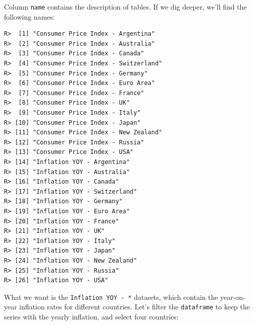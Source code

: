 \documentclass[
  12pt,
]{book}
\newenvironment{Shaded}{\begin{snugshade}}{\end{snugshade}}
\newcommand{\CommentTok}[1]{\textcolor[rgb]{0.37,0.37,0.37}{\textit{#1}}}
\newcommand{\FunctionTok}[1]{\textcolor[rgb]{0,0,0}{#1}}
\newcommand{\NormalTok}[1]{#1}
\newcommand{\OtherTok}[1]{\textcolor[rgb]{0.37,0.37,0.37}{#1}}
\newcommand{\SpecialCharTok}[1]{\textcolor[rgb]{0,0,0}{#1}}
\newcommand{\StringTok}[1]{\textcolor[rgb]{0.5,0.5,0.5}{#1}}
\begin{document}
Column \texttt{name} contains the description of tables. If we dig deeper, we'll find the following names:

\begin{Shaded}
\end{Shaded}

\begin{verbatim}
R>  [1] "Consumer Price Index - Argentina"  
R>  [2] "Consumer Price Index - Australia"  
R>  [3] "Consumer Price Index - Canada"     
R>  [4] "Consumer Price Index - Switzerland"
R>  [5] "Consumer Price Index - Germany"    
R>  [6] "Consumer Price Index - Euro Area"  
R>  [7] "Consumer Price Index - France"     
R>  [8] "Consumer Price Index - UK"         
R>  [9] "Consumer Price Index - Italy"      
R> [10] "Consumer Price Index - Japan"      
R> [11] "Consumer Price Index - New Zealand"
R> [12] "Consumer Price Index - Russia"     
R> [13] "Consumer Price Index - USA"        
R> [14] "Inflation YOY - Argentina"         
R> [15] "Inflation YOY - Australia"         
R> [16] "Inflation YOY - Canada"            
R> [17] "Inflation YOY - Switzerland"       
R> [18] "Inflation YOY - Germany"           
R> [19] "Inflation YOY - Euro Area"         
R> [20] "Inflation YOY - France"            
R> [21] "Inflation YOY - UK"                
R> [22] "Inflation YOY - Italy"             
R> [23] "Inflation YOY - Japan"             
R> [24] "Inflation YOY - New Zealand"       
R> [25] "Inflation YOY - Russia"            
R> [26] "Inflation YOY - USA"
\end{verbatim}

What we want is the \texttt{\textquotesingle{}Inflation\ YOY\ -\ *\textquotesingle{}} datasets, which contain the year-on-year inflation rates for different countries. Let's filter the \texttt{dataframe} to keep the series with the yearly inflation, and select four countries:

\begin{Shaded}
\end{Shaded}
\end{document}
